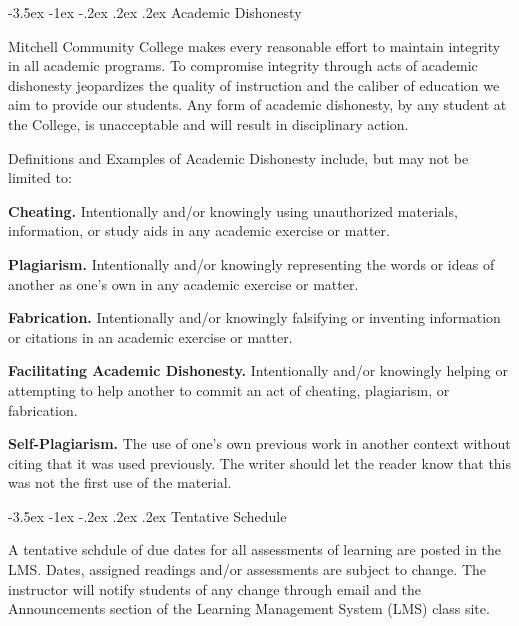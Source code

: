 \documentclass{article}
\makeatletter
\renewcommand\section{\@startsection{section}{1}{0pt}%
  {-3.5ex \@plus -1ex \@minus -.2ex}%
  {.2ex \@plus.2ex}%
  {\normalfont\Large\bfseries}} %
\makeatother
\begin{document}
\section{Academic Dishonesty}

Mitchell Community College makes every reasonable effort to maintain integrity in all academic programs. To compromise integrity through acts of academic dishonesty jeopardizes the quality of instruction and the caliber of education we aim to provide our students.  Any form of academic dishonesty, by any student at the College, is unacceptable and will result in disciplinary action.

Definitions and Examples of Academic Dishonesty include, but may not be limited to:

\textbf{Cheating.} Intentionally and/or knowingly using unauthorized materials, information, or study aids in any academic exercise or matter.

\textbf{Plagiarism.} Intentionally and/or knowingly representing the words or ideas of another as one's own in any academic exercise or matter.

\textbf{Fabrication.} Intentionally and/or knowingly falsifying or inventing information or citations in an academic exercise or matter.

\textbf{Facilitating Academic Dishonesty.} Intentionally and/or knowingly helping or attempting to help another to commit an act of cheating, plagiarism, or fabrication.

\textbf{Self-Plagiarism.} The use of one's own previous work in another context without citing that it was used previously. The writer should let the reader know that this was not the first use of the material.

\section{Tentative Schedule}

A tentative schdule of due dates for all assessments of learning are posted in the LMS. Dates, assigned readings and/or assessments are subject to change. The instructor will notify students of any change through email and the Announcements section of the Learning Management System (LMS) class site.
\end{document}
